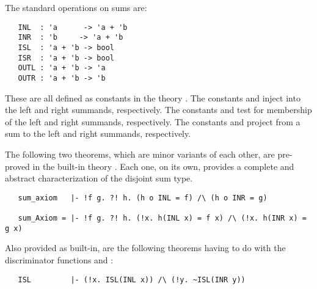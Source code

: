 {The standard operations on sums are:


\begin{hol}
\begin{verbatim}
   INL  : 'a      -> 'a + 'b
   INR  : 'b     -> 'a + 'b
   ISL  : 'a + 'b -> bool
   ISR  : 'a + 'b -> bool
   OUTL : 'a + 'b -> 'a
   OUTR : 'a + 'b -> 'b
\end{verbatim}\end{hol}

\noindent These are all defined as constants in the theory .  The
constants  and  inject into the left and right summands,
respectively. The constants  and  test for membership of the
left and right summands, respectively. The constants  and 
project from a sum to the left and right summands, respectively.

The following two theorems, which are minor variants of each other, are
pre-proved in the built-in theory . Each one, on its own, provides a
complete and abstract characterization of the disjoint sum type.

\begin{hol}
\begin{verbatim}
   sum_axiom   |- !f g. ?! h. (h o INL = f) /\ (h o INR = g)

   sum_Axiom = |- !f g. ?! h. (!x. h(INL x) = f x) /\ (!x. h(INR x) = g x)
\end{verbatim}\end{hol}

\noindent Also provided as built-in, are the following theorems having to
do with the discriminator functions  and :

\begin{hol}
\begin{verbatim}
   ISL         |- (!x. ISL(INL x)) /\ (!y. ~ISL(INR y))


\end{verbatim}
\end{hol}}

